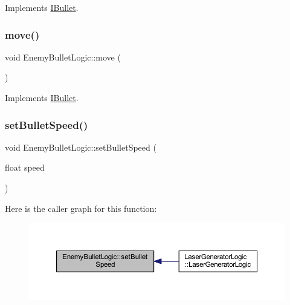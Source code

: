 Implements \hyperlink{class_i_bullet_ac1252496738126ec94a97512011b9112}{I\+Bullet}.

\mbox{\label{class_enemy_bullet_logic_aaa5273b969347ce8c6e62261ccc3df3a}} 
\subsubsection{\texorpdfstring{move()}{move()}}
{\footnotesize\ttfamily void Enemy\+Bullet\+Logic\+::move (\begin{DoxyParamCaption}{ }\end{DoxyParamCaption})\hspace{0.3cm}{\ttfamily [virtual]}}



Implements \hyperlink{class_i_bullet_a0884074f0bc793fb5a52ac33842622fd}{I\+Bullet}.

\mbox{\label{class_enemy_bullet_logic_a0263d2207f0d4332efa2cf8f8bbdc42c}} 
\subsubsection{\texorpdfstring{set\+Bullet\+Speed()}{setBulletSpeed()}}
{\footnotesize\ttfamily void Enemy\+Bullet\+Logic\+::set\+Bullet\+Speed (\begin{DoxyParamCaption}\item[{float}]{speed }\end{DoxyParamCaption})}

Here is the caller graph for this function\+:\nopagebreak
\begin{figure}[H]
\begin{center}
\leavevmode
\includegraphics[width=350pt]{class_enemy_bullet_logic_a0263d2207f0d4332efa2cf8f8bbdc42c_icgraph}
\end{center}
\end{figure}
\mbox{\label{class_enemy_bullet_logic_a3e4ce40e06e9fa23826bd74015fd75f2}} 
